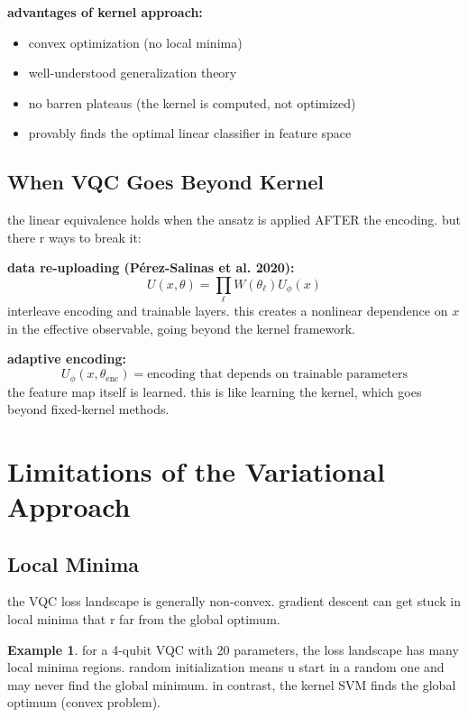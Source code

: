 \documentclass[11pt,a4paper]{article}
\theoremstyle{definition}
\newtheorem{example}{Example}[section]
\theoremstyle{remark}
\begin{document}
\textbf{advantages of kernel approach:}
\begin{itemize}
    \item convex optimization (no local minima)
    \item well-understood generalization theory
    \item no barren plateaus (the kernel is computed, not optimized)
    \item provably finds the optimal linear classifier in feature space
\end{itemize}

\subsection{When VQC Goes Beyond Kernel}

the linear equivalence holds when the ansatz is applied AFTER the encoding. but there r ways to break it:

\textbf{data re-uploading (P\'erez-Salinas et al. 2020):}
\[
U(x, \theta) = \prod_\ell W(\theta_\ell) U_\phi(x)
\]
interleave encoding and trainable layers. this creates a nonlinear dependence on $x$ in the effective observable, going beyond the kernel framework.

\textbf{adaptive encoding:}
\[
U_\phi(x, \theta_{\text{enc}}) = \text{encoding that depends on trainable parameters}
\]
the feature map itself is learned. this is like learning the kernel, which goes beyond fixed-kernel methods.

\section{Limitations of the Variational Approach}

\subsection{Local Minima}

the VQC loss landscape is generally non-convex. gradient descent can get stuck in local minima that r far from the global optimum.

\begin{example}
for a 4-qubit VQC with 20 parameters, the loss landscape has many local minima regions. random initialization means u start in a random one and may never find the global minimum. in contrast, the kernel SVM finds the global optimum (convex problem).
\end{example}
\end{document}
